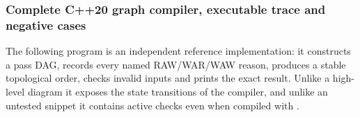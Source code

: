 \subsubsection{Complete C++20 graph compiler, executable trace and negative cases}\label{06-engine-ii-ch042-complete-c20-graph-compiler-executable-trace-and-negative-cases}

\hypertarget{06-engine-ii-ch042-complete-c20-graph-compiler-executable-trace-and-negative-cases}{}

The following program is an independent reference implementation: it constructs a pass DAG, records every named RAW/WAR/WAW reason, produces a stable topological order, checks invalid inputs and prints the exact result. Unlike a high-level diagram it exposes the state transitions of the compiler, and unlike an untested snippet it contains active checks even when compiled with .

